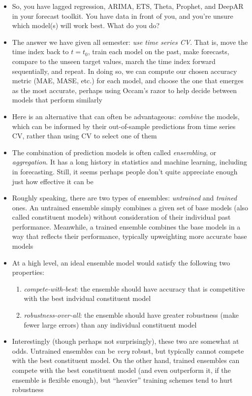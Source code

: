 \documentclass{article}
\begin{document}
\begin{itemize}
\item So, you have lagged regression, ARIMA, ETS, Theta, Prophet, and DeepAR in
  your forecast toolkit. You have data in front of you, and you're unsure which
  model(s) will work best. What do you do?    

\item The answer we have given all semester: \emph{use time series CV}. That is,
  move the time index back to $t = t_0$, train each model on the past, make 
  forecasts, compare to the unseen target values, march the time index forward
  sequentially, and repeat. In doing so, we can compute our chosen accuracy
  metric (MAE, MASE, etc.) for each model, and choose the one that emerges as 
  the most accurate, perhaps using Occam's razor to help decide between models
  that perform similarly

\item Here is an alternative that can often be advantageous: \emph{combine} the
  models, which can be informed by their out-of-sample predictions from time 
  series CV, rather than using CV to select one of them
  
\item The combination of prediction models is often called \emph{ensembling}, or
  \emph{aggregation}. It has a long history in statistics and machine learning,
  including in forecasting. Still, it seems perhaps people don't quite
  appreciate enough just how effective it can be

\item Roughly speaking, there are two types of ensembles: \emph{untrained} and
  \emph{trained} ones. An untrained ensemble simply combines a given set of 
  base models (also called constituent models) without consideration of
  their individual past performance. Meanwhile, a trained ensemble combines the
  base models in a way that reflects their performance, typically upweighting
  more accurate base models 

\item At a high level, an ideal ensemble model would satisfy the following two
  properties:
  \begin{enumerate}
  \item \emph{compete-with-best}: the ensemble should have accuracy that is
    competitive with the best indvidual constituent model 
  \item \emph{robustness-over-all}: the ensemble should have greater robustness
    (make fewer large errors) than any individual constituent model  
  \end{enumerate}

\item Interestingly (though perhaps not surprisingly), these two are somewhat at 
  odds. Untrained ensembles can be \emph{very} robust, but typically cannot 
  compete with the best constituent model. On the other hand, trained ensembles 
  can compete with the best constituent model (and even outperform it, if the
  ensemble is flexible enough), but ``heavier'' training schemes tend to hurt 
  robustness 
\end{itemize}
\end{document}
